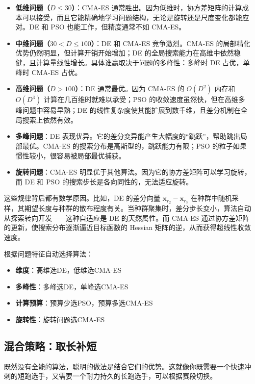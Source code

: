 \documentclass[lang=cn,zihao=-4,a4paper,fontset=windows]{beautybook}
\begin{document}
\begin{itemize}
    \item \textbf{低维问题（$D \le 30$）}：CMA-ES 通常胜出。因为低维时，协方差矩阵的计算成本可以接受，而且它能精确地学习问题结构，无论是旋转还是尺度变化都能应对。DE 和 PSO 也能工作，但精度通常不如 CMA-ES。
    \item \textbf{中维问题（$30 < D \le 100$）}：DE 和 CMA-ES 竞争激烈。CMA-ES 的局部精化优势仍然明显，但计算开销开始增加；DE 的全局搜索能力在高维中依然稳健，且计算量线性增长。具体谁赢取决于问题的多峰性：多峰时 DE 占优，单峰时 CMA-ES 占优。
    \item \textbf{高维问题（$D > 100$）}：DE 通常最优。因为 CMA-ES 的 $O(D^2)$ 内存和 $O(D^3)$ 计算在几百维时就难以承受；PSO 的收敛速度虽然快，但在高维多峰问题中容易早熟；DE 的线性复杂度使其能扩展到数千维，且差分机制在全局搜索上依然有效。
    \item \textbf{多峰问题}：DE 表现优异。它的差分变异能产生大幅度的“跳跃”，帮助跳出局部最优。CMA-ES 的搜索分布是高斯型的，跳跃能力有限；PSO 的粒子如果惯性较小，很容易被局部最优捕获。
    \item \textbf{旋转问题}：CMA-ES 明显优于其他算法。因为它的协方差矩阵可以学习旋转，而 DE 和 PSO 的搜索步长是各向同性的，无法适应旋转。
\end{itemize}

这些规律背后都有数学原因。比如，DE 的差分向量 $\mathbf{x}_{r_2} - \mathbf{x}_{r_3}$ 在种群中随机采样，其期望长度与种群的散布程度有关。当种群聚集时，差分步长变小，算法自动从探索转向开发——这种自适应是 DE 的天然属性。而 CMA-ES 通过协方差矩阵的更新，使搜索分布逐渐逼近目标函数的 Hessian 矩阵的逆，从而获得超线性收敛速度。

根据问题特征自动选择算法：
\begin{itemize}
    \item \textbf{维度}：高维选DE，低维选CMA-ES
    \item \textbf{多峰性}：多峰选DE，单峰选CMA-ES
    \item \textbf{计算预算}：预算少选PSO，预算多选CMA-ES
    \item \textbf{旋转性}：旋转问题选CMA-ES
\end{itemize}

\subsection{混合策略：取长补短}

既然没有全能的算法，聪明的做法是结合它们的优势。这就像你既需要一个快速冲刺的短跑选手，又需要一个耐力持久的长跑选手，可以根据赛段切换。
\end{document}
